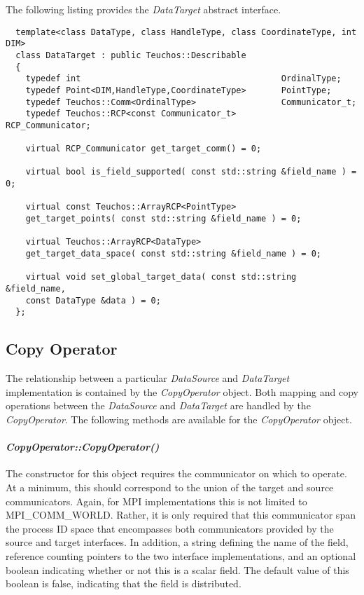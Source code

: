 \documentclass[letterpaper]{article}
\begin{document}
The following listing provides the {\sl DataTarget} abstract
interface. 

\begin{lstlisting}
  template<class DataType, class HandleType, class CoordinateType, int DIM>
  class DataTarget : public Teuchos::Describable
  {
    typedef int                                        OrdinalType;
    typedef Point<DIM,HandleType,CoordinateType>       PointType;
    typedef Teuchos::Comm<OrdinalType>                 Communicator_t;
    typedef Teuchos::RCP<const Communicator_t>         RCP_Communicator;

    virtual RCP_Communicator get_target_comm() = 0;

    virtual bool is_field_supported( const std::string &field_name ) = 0;

    virtual const Teuchos::ArrayRCP<PointType> 
    get_target_points( const std::string &field_name ) = 0;

    virtual Teuchos::ArrayRCP<DataType> 
    get_target_data_space( const std::string &field_name ) = 0;

    virtual void set_global_target_data( const std::string &field_name,
    const DataType &data ) = 0;
  };
\end{lstlisting}

\subsection{Copy Operator}
The relationship between a particular {\sl DataSource} and {\sl
  DataTarget} implementation is contained by the {\sl CopyOperator}
object. Both mapping and copy operations between the {\sl DataSource}
and {\sl DataTarget} are handled by the {\sl CopyOperator}. The
following methods are available for the {\sl CopyOperator} object.

\paragraph{\sl CopyOperator::CopyOperator()}
The constructor for this object requires the communicator on which to
operate. At a minimum, this should correspond to the union of the
target and source communicators. Again, for MPI implementations this
is not limited to MPI\_COMM\_WORLD. Rather, it is only required that
this communicator span the process ID space that encompasses both
communicators provided by the source and target interfaces. In
addition, a string defining the name of the field, reference counting
pointers to the two interface implementations, and an optional boolean
indicating whether or not this is a scalar field. The default value of
this boolean is false, indicating that the field is distributed.
\end{document}

